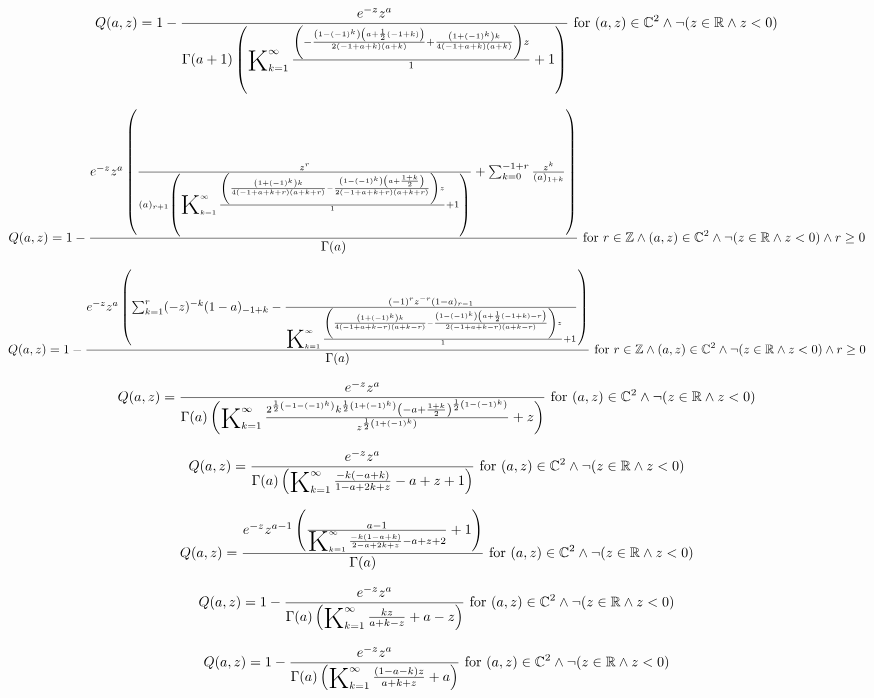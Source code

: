 \documentclass{article}
\newcommand{\bigK}{\mathop{\raisebox{-5pt}{\huge K}}}
\begin{document}
\[Q(a,z)=1-\frac{e^{-z} z^a}{\Gamma (a+1) \left(\bigK_{k=1}^{\infty}\frac{\left(-\frac{\left(1-(-1)^k\right) \left(a+\frac{1}{2} (-1+k)\right)}{2 (-1+a+k) (a+k)}+\frac{\left(1+(-1)^k\right) k}{4 (-1+a+k) (a+k)}\right) z}{1}+1\right)}\text{ for }(a,z)\in \mathbb{C}^2\land \neg (z\in \mathbb{R}\land z<0)\] 

\[Q(a,z)=1-\frac{e^{-z} z^a \left(\frac{z^r}{(a)_{r+1} \left(\bigK_{k=1}^{\infty}\frac{\left(\frac{\left(1+(-1)^k\right) k}{4 (-1+a+k+r) (a+k+r)}-\frac{\left(1-(-1)^k\right) \left(a+\frac{1+k}{2}\right)}{2 (-1+a+k+r) (a+k+r)}\right) z}{1}+1\right)}+\sum _{k=0}^{-1+r} \frac{z^k}{(a)_{1+k}}\right)}{\Gamma (a)}\text{ for }r\in \mathbb{Z}\land (a,z)\in \mathbb{C}^2\land \neg (z\in \mathbb{R}\land z<0)\land r\geq 0\] 

\[Q(a,z)=1-\frac{e^{-z} z^a \left(\sum _{k=1}^r (-z)^{-k} (1-a)_{-1+k}-\frac{(-1)^r z^{-r} (1-a)_{r-1}}{\bigK_{k=1}^{\infty}\frac{\left(\frac{\left(1+(-1)^k\right) k}{4 (-1+a+k-r) (a+k-r)}-\frac{\left(1-(-1)^k\right) \left(a+\frac{1}{2} (-1+k)-r\right)}{2 (-1+a+k-r) (a+k-r)}\right) z}{1}+1}\right)}{\Gamma (a)}\text{ for }r\in \mathbb{Z}\land (a,z)\in \mathbb{C}^2\land \neg (z\in \mathbb{R}\land z<0)\land r\geq 0\] 

\[Q(a,z)=\frac{e^{-z} z^a}{\Gamma (a) \left(\bigK_{k=1}^{\infty}\frac{2^{\frac{1}{2} \left(-1-(-1)^k\right)} k^{\frac{1}{2} \left(1+(-1)^k\right)} \left(-a+\frac{1+k}{2}\right)^{\frac{1}{2} \left(1-(-1)^k\right)}}{z^{\frac{1}{2} \left(1+(-1)^k\right)}}+z\right)}\text{ for }(a,z)\in \mathbb{C}^2\land \neg (z\in \mathbb{R}\land z<0)\] 

\[Q(a,z)=\frac{e^{-z} z^a}{\Gamma (a) \left(\bigK_{k=1}^{\infty}\frac{-k (-a+k)}{1-a+2 k+z}-a+z+1\right)}\text{ for }(a,z)\in \mathbb{C}^2\land \neg (z\in \mathbb{R}\land z<0)\] 

\[Q(a,z)=\frac{e^{-z} z^{a-1} \left(\frac{a-1}{\bigK_{k=1}^{\infty}\frac{-k (1-a+k)}{2-a+2 k+z}-a+z+2}+1\right)}{\Gamma (a)}\text{ for }(a,z)\in \mathbb{C}^2\land \neg (z\in \mathbb{R}\land z<0)\] 

\[Q(a,z)=1-\frac{e^{-z} z^a}{\Gamma (a) \left(\bigK_{k=1}^{\infty}\frac{k z}{a+k-z}+a-z\right)}\text{ for }(a,z)\in \mathbb{C}^2\land \neg (z\in \mathbb{R}\land z<0)\] 

\[Q(a,z)=1-\frac{e^{-z} z^a}{\Gamma (a) \left(\bigK_{k=1}^{\infty}\frac{(1-a-k) z}{a+k+z}+a\right)}\text{ for }(a,z)\in \mathbb{C}^2\land \neg (z\in \mathbb{R}\land z<0)\] 
\end{document}
